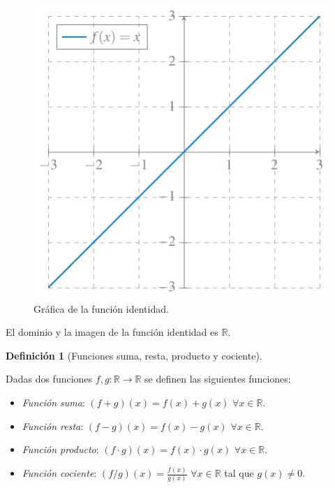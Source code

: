 \documentclass[
  a4paper,
]{scrreport}
\providecommand{\tightlist}{%
  \setlength{\itemsep}{0pt}\setlength{\parskip}{0pt}}\usepackage{longtable,booktabs,array}
\theoremstyle{definition}
\theoremstyle{plain}
\theoremstyle{definition}
\newtheorem{definition}{Definición}[chapter]
\theoremstyle{definition}
\theoremstyle{plain}
\theoremstyle{plain}
\theoremstyle{remark}
\begin{document}
\begin{figure}[H]

{\centering \includegraphics{./img/funciones/funcion-identidad.pdf}

}

\caption{Gráfica de la función identidad.}

\end{figure}%

El dominio y la imagen de la función identidad es \(\mathbb{R}\).

\begin{definition}[Funciones suma, resta, producto y
cociente]\protect\hypertarget{def-funcion-suma-resta-producto-cociente}{}\label{def-funcion-suma-resta-producto-cociente}

Dadas dos funciones \(f,g: \mathbb{R}\rightarrow \mathbb{R}\) se definen
las siguientes funciones:

\begin{itemize}
\tightlist
\item
  \emph{Función suma}: \((f+g)(x) = f(x)+g(x)\)
  \(\forall x\in\mathbb{R}\).
\item
  \emph{Función resta}: \((f-g)(x) = f(x)-g(x)\)
  \(\forall x\in\mathbb{R}\).
\item
  \emph{Función producto}: \((f\cdot g)(x) = f(x)\cdot g(x)\)
  \(\forall x\in\mathbb{R}\).
\item
  \emph{Función cociente}: \((f/g)(x) = \frac{f(x)}{g(x)}\)
  \(\forall x\in\mathbb{R}\) tal que \(g(x)\neq 0\).
\end{itemize}

\end{definition}
\end{document}
